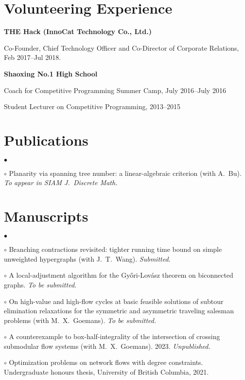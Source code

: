 \documentclass[margin,line]{res}
\newenvironment{list1}{
  \begin{list}{\ding{113}}{%
      \setlength{\itemsep}{0in}
      \setlength{\parsep}{0.025in} \setlength{\parskip}{0in}
      \setlength{\topsep}{0in} \setlength{\partopsep}{0in}
      \setlength{\leftmargin}{0.17in}}}{\end{list}}
\newenvironment{list2}{
  \begin{list}{$\bullet$}{%
      \setlength{\itemsep}{0in}
      \setlength{\parsep}{0in} \setlength{\parskip}{0in}
      \setlength{\topsep}{0in} \setlength{\partopsep}{0in}
      \setlength{\leftmargin}{0.2in}}}{\end{list}}
\begin{document}
\begin{resume}
\section{\sc Volunteering Experience}

{\bf THE Hack (InnoCat Technology Co., Ltd.)}\\
\vspace*{-.1in}
\begin{list1}
\item[] Co-Founder, Chief Technology Officer and Co-Director of Corporate Relations, Feb 2017--Jul 2018.
\end{list1}

{\bf Shaoxing No.1 High School}\\
\vspace*{-.1in}
\begin{list1}
\item[] Coach for Competitive Programming Summer Camp, July 2016--July 2016
\item[] Student Lecturer on Competitive Programming, 2013--2015
\end{list1}


\section{\sc Publications}
\begin{list2}
  \item[$\circ$] Planarity via spanning tree number: a linear-algebraic criterion (with A.\ Bu). \emph{To appear in SIAM J.\ Discrete Math.}
\end{list2}


\section{\sc Manuscripts}

\begin{list2}
  \item[$\circ$] Branching contractions revisited: tighter running time bound on simple unweighted hypergraphs (with J.\ T.\ Wang). \emph{Submitted.}
  \item[$\circ$] A local-adjustment algorithm for the Gy\H{o}ri-Lov\'asz theorem on biconnected graphs. \emph{To be submitted.}
  \item[$\circ$] On high-value and high-flow cycles at basic feasible solutions of subtour elimination relaxations for the symmetric and asymmetric traveling salesman problems (with M.\ X.\ Goemans). \emph{To be submitted.}
  \item[$\circ$] A counterexample to box-half-integrality of the intersection of crossing submodular flow systems (with M.\ X.\ Goemans). 2023. \emph{Unpublished.}
  \item[$\circ$] Optimization problems on network flows with degree constraints. Undergraduate honours thesis, University of British Columbia, 2021. %
\end{list2}



\end{resume}
\end{document}
